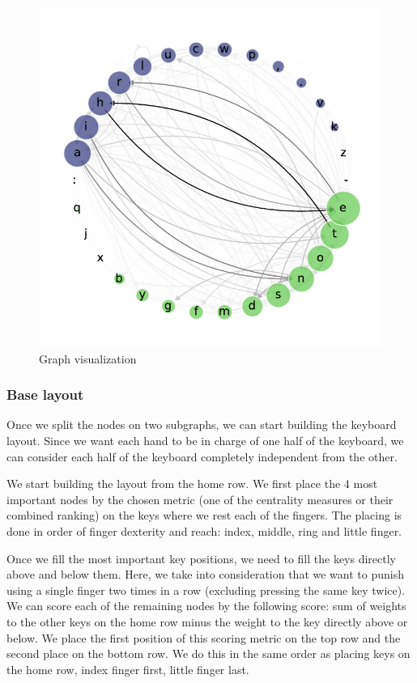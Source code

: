 \documentclass[9pt,twocolumn,twoside]{pnas-report}
\begin{document}
{\begin{figure}[h]\centering%
    \includegraphics[width=0.75\linewidth]{fig/net}
    \caption{Graph visualization}
    \label{fig:network}
\end{figure}

\subsubsection*{Base layout}

Once we split the nodes on two subgraphs, we can start building the keyboard layout.
Since we want each hand to be in charge of one half of the keyboard, we can consider each half of the keyboard completely independent from the other.

We start building the layout from the home row.
We first place the 4 most important nodes by the chosen metric (one of the centrality measures or their combined ranking) on the keys where we rest each of the fingers.
The placing is done in order of finger dexterity and reach: index, middle, ring and little finger.

Once we fill the most important key positions, we need to fill the keys directly above and below them.
Here, we take into consideration that we want to punish using a single finger two times in a row (excluding pressing the same key twice).
We can score each of the remaining nodes by the following score: sum of weights to the other keys on the home row minus the weight to the key directly above or below.
We place the first position of this scoring metric on the top row and the second place on the bottom row.
We do this in the same order as placing keys on the home row, index finger first, little finger last.

}
\end{document}
